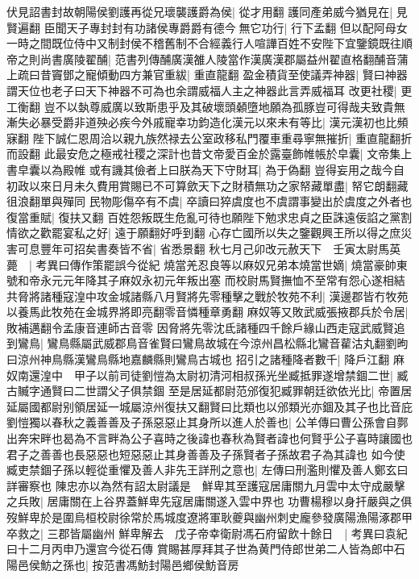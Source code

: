 伏見詔書封故朝陽侯劉護再從兄瓌襲護爵為侯|{
	從才用翻}
護同產弟威今猶見在|{
	見賢遍翻}
臣聞天子專封封有功諸侯專爵爵有德今無它功行|{
	行下孟翻}
但以配阿母女一時之間既位侍中又制封侯不稽舊制不合經義行人喧譁百姓不安陛下宜鑒鏡既往順帝之則尚書廣陵翟酺|{
	范書列傳酺廣漢雒人陵當作漢廣漢郡屬益州翟直格翻酺音蒲}
上疏曰昔竇鄧之寵傾動四方兼官重紱|{
	重直龍翻}
盈金積貨至使議弄神器|{
	賢曰神器謂天位也老子曰天下神器不可為也余謂威福人主之神器此言弄威福耳}
改更社稷|{
	更工衡翻}
豈不以埶尊威廣以致斯患乎及其破壞頭顙墮地願為孤豚豈可得哉夫致貴無漸失必暴受爵非道殃必疾今外戚寵幸功鈞造化漢元以來未有等比|{
	漢元漢初也比頻寐翻}
陛下誠仁恩周洽以親九族然禄去公室政移私門覆車重尋寧無摧折|{
	重直龍翻折而設翻}
此最安危之極戒社稷之深計也昔文帝愛百金於露臺飾帷帳於皁囊|{
	文帝集上書皁囊以為殿帷}
或有譏其儉者上曰朕為天下守財耳|{
	為于偽翻}
豈得妄用之哉今自初政以來日月未久費用賞賜已不可算歛天下之財積無功之家帑藏單盡|{
	帑它朗翻藏徂浪翻單與殫同}
民物彫傷卒有不虞|{
	卒讀曰猝虞度也不虞謂事變出於虞度之外者也}
復當重賦|{
	復扶又翻}
百姓怨叛既生危亂可待也願陛下勉求忠貞之臣誅遠佞諂之黨割情欲之歡罷宴私之好|{
	遠于願翻好呼到翻}
心存亡國所以失之鑒觀興王所以得之庶災害可息豐年可招矣書奏皆不省|{
	省悉景翻}
秋七月己卯改元赦天下　壬寅太尉馬英薨　|{
	考異曰傳作策罷誤今從紀}
燒當羌忍良等以麻奴兄弟本燒當世嫡|{
	燒當豪帥東號和帝永元元年降其子麻奴永初元年叛出塞}
而校尉馬賢撫恤不至常有怨心遂相結共脅將諸種寇湟中攻金城諸縣八月賢將先零種擊之戰於牧苑不利|{
	漢邊郡皆冇牧苑以養馬此牧苑在金城界將即亮翻零音憐種章勇翻}
麻奴等又敗武威張掖郡兵於令居|{
	敗補邁翻令孟康音連師古音零}
因脅將先零沈氐諸種四千餘戶緣山西走寇武威賢追到鸞鳥|{
	鸞鳥縣屬武威郡鳥音雀賢曰鸞鳥故城在今涼州昌松縣北鸞音雚沽丸翻劉昫曰涼州神鳥縣漢鸞鳥縣地嘉麟縣則鸞鳥古城也}
招引之諸種降者數千|{
	降戶江翻}
麻奴南還湟中　甲子以前司徒劉愷為太尉初清河相叔孫光坐臧抵罪遂增禁錮二世|{
	臧古贓字通賢曰二世謂父子俱禁錮}
至是居延都尉范邠復犯臧罪朝廷欲依光比|{
	帝置居延屬國都尉别領居延一城屬涼州復扶又翻賢曰比類也以邠類光亦錮及其子也比音庇}
劉愷獨以春秋之義善善及子孫惡惡止其身所以進人於善也|{
	公羊傳曰曹公孫會自鄸出奔宋畔也曷為不言畔為公子喜時之後諱也春秋為賢者諱也何賢乎公子喜時讓國也君子之善善也長惡惡也短惡惡止其身善善及子孫賢者子孫故君子為其諱也}
如今使臧吏禁錮子孫以輕從重懼及善人非先王詳刑之意也|{
	左傳曰刑濫則懼及善人鄭玄曰詳審察也}
陳忠亦以為然有詔太尉議是　鮮卑其至護寇居庸關九月雲中太守成嚴擊之兵敗|{
	居庸關在上谷界蓋鮮卑先寇居庸關遂入雲中界也}
功曹楊穆以身扞嚴與之俱歿鮮卑於是圍烏桓校尉徐常於馬城度遼將軍耿夔與幽州刺史龐參發廣陽漁陽涿郡甲卒救之|{
	三郡皆屬幽州}
鮮卑解去　戊子帝幸衛尉馮石府留飲十餘日　|{
	考異曰袁紀曰十二月丙申乃還宫今從石傳}
賞賜甚厚拜其子世為黄門侍郎世弟二人皆為郎中石陽邑侯魴之孫也|{
	按范書馮魴封陽邑鄉侯魴音房}
